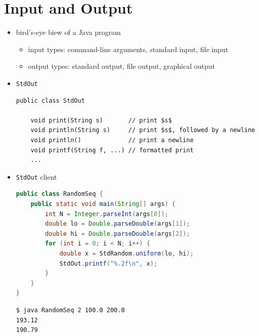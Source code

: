 \documentclass[8pt,a4paper,compress]{beamer}
\begin{document}
\section{Input and Output}
\begin{frame}[fragile]
\begin{itemize}
\item bird's-eye biew of a Java program
\begin{center}
\end{center}

\begin{itemize}
\item input types: command-line arguments, standard input, file input
\item output types: standard output, file output, graphical output
\end{itemize}

\item \lstinline{StdOut}
\begin{lstlisting}[language={},mathescape]
public class StdOut

    void print(String s)       // print $s$
    void println(String s)     // print $s$, followed by a newline
    void println()             // print a newline
    void printf(String f, ...) // formatted print
    ...
\end{lstlisting}

\item \lstinline{StdOut} client
\begin{lstlisting}[language=Java]
public class RandomSeq {
    public static void main(String[] args) { 
        int N = Integer.parseInt(args[0]);
        double lo = Double.parseDouble(args[1]);
        double hi = Double.parseDouble(args[2]);
        for (int i = 0; i < N; i++) {
            double x = StdRandom.uniform(lo, hi);
            StdOut.printf("%.2f\n", x);
        }
    }
}
\end{lstlisting}

\begin{lstlisting}[language={}]
$ java RandomSeq 2 100.0 200.0
193.12
190.79
\end{lstlisting}
\end{itemize}
\end{frame}
\end{document}
